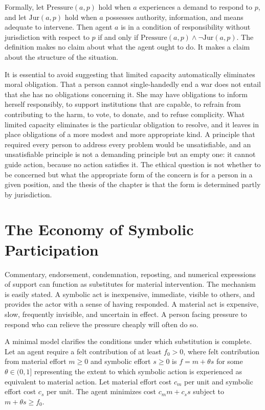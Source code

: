 \documentclass[11pt]{report}
\theoremstyle{definition}
\theoremstyle{remark}
\begin{document}
Formally, let $\mathrm{Pressure}(a,p)$ hold when $a$ experiences a demand to respond to $p$, and let $\mathrm{Jur}(a,p)$ hold when $a$ possesses authority, information, and means adequate to intervene. Then agent $a$ is in a condition of responsibility without jurisdiction with respect to $p$ if and only if $\mathrm{Pressure}(a,p)\wedge\neg\mathrm{Jur}(a,p)$. The definition makes no claim about what the agent ought to do. It makes a claim about the structure of the situation.

It is essential to avoid suggesting that limited capacity automatically eliminates moral obligation. That a person cannot single-handedly end a war does not entail that she has no obligations concerning it. She may have obligations to inform herself responsibly, to support institutions that are capable, to refrain from contributing to the harm, to vote, to donate, and to refuse complicity. What limited capacity eliminates is the particular obligation to resolve, and it leaves in place obligations of a more modest and more appropriate kind. A principle that required every person to address every problem would be unsatisfiable, and an unsatisfiable principle is not a demanding principle but an empty one: it cannot guide action, because no action satisfies it. The ethical question is not whether to be concerned but what the appropriate form of the concern is for a person in a given position, and the thesis of the chapter is that the form is determined partly by jurisdiction.

\section{The Economy of Symbolic Participation}

Commentary, endorsement, condemnation, reposting, and numerical expressions of support can function as substitutes for material intervention. The mechanism is easily stated. A symbolic act is inexpensive, immediate, visible to others, and provides the actor with a sense of having responded. A material act is expensive, slow, frequently invisible, and uncertain in effect. A person facing pressure to respond who can relieve the pressure cheaply will often do so.

A minimal model clarifies the conditions under which substitution is complete. Let an agent require a felt contribution of at least $f_0>0$, where felt contribution from material effort $m\ge0$ and symbolic effort $s\ge0$ is $f=m+\theta s$ for some $\theta\in(0,1]$ representing the extent to which symbolic action is experienced as equivalent to material action. Let material effort cost $c_m$ per unit and symbolic effort cost $c_s$ per unit. The agent minimizes cost $c_mm+c_ss$ subject to $m+\theta s\ge f_0$.
\end{document}
